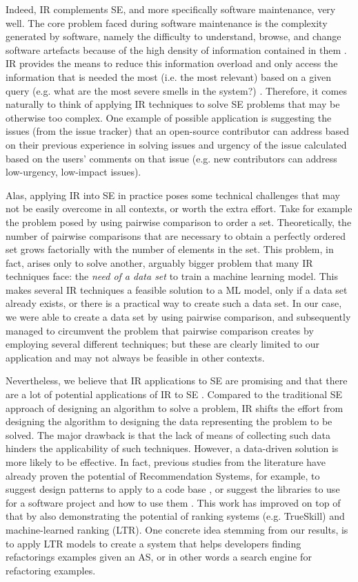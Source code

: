 Indeed, IR complements SE, and more specifically software maintenance, very well.
The core problem faced during software maintenance is the complexity generated by software, namely the difficulty to understand, browse, and change software artefacts because of the high density of information contained in them \cite{Robillard2010}.
IR provides the means to reduce this information overload and only access the information that is needed the most (i.e. the most relevant) based on a given query (e.g. what are the most severe smells in the system?) \cite{Robillard2010}.
Therefore, it comes naturally to think of applying IR techniques to solve SE problems that may be otherwise too complex.
One example of possible application is suggesting the issues (from the issue tracker) that an open-source contributor can address based on their previous experience in solving issues and urgency of the issue calculated based on the users' comments on that issue (e.g. new contributors can address low-urgency, low-impact issues).

Alas, applying IR into SE in practice poses some technical challenges that may not be easily overcome in all contexts, or worth the extra effort.
Take for example the problem posed by using pairwise comparison to order a set.
Theoretically, the number of pairwise comparisons that are necessary to obtain a perfectly ordered set grows factorially with the number of elements in the set.
This problem, in fact, arises only to solve another, arguably bigger problem that many IR techniques face: the \emph{need of a data set} to train a machine learning model.
This makes several IR techniques a feasible solution to a ML model, only if a data set already exists, or there is a practical way to create such a data set.
In our case, we were able to create a data set by using pairwise comparison, and subsequently managed to circumvent the problem that pairwise comparison creates by employing several different techniques; but these are clearly limited to our application and may not always be feasible in other contexts.

Nevertheless, we believe that IR applications to SE are promising and that there are a lot of potential applications of IR to SE \cite{Happel2008,Robillard2010}.
Compared to the traditional SE approach of designing an algorithm to solve a problem, IR shifts the effort from designing the algorithm to designing the data representing the problem to be solved.
The major drawback is that the lack of means of collecting such data hinders the applicability of such techniques. However, a data-driven solution is more likely to be effective.
In fact, previous studies from the literature have already proven the potential of Recommendation Systems, for example, to suggest design patterns to apply to a code base \cite{Palma2012}, or suggest the libraries to use for a software project and how to use them \cite{DiRocco2021}.
This work has improved on top of that by also demonstrating the potential of ranking systems (e.g. TrueSkill) and machine-learned ranking (LTR).
One concrete idea stemming from our results, is to apply LTR models to create a system that helps developers finding refactorings examples given an AS, or in other words a search engine for refactoring examples.

